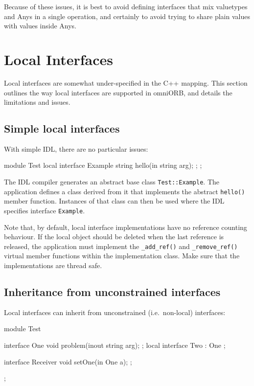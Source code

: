 \documentclass[11pt,twoside,a4paper]{book}
\newcommand{\type}[1]{\texttt{#1}}
\newcommand{\op}[1]{\texttt{#1()}}
\begin{document}
Because of these issues, it is best to avoid defining interfaces that
mix valuetypes and Anys in a single operation, and certainly to avoid
trying to share plain values with values inside Anys.


\section{Local Interfaces}
\label{sec:LocalInterfaces}

Local interfaces are somewhat under-specified in the C++ mapping. This
section outlines the way local interfaces are supported in omniORB,
and details the limitations and issues.

\subsection{Simple local interfaces}

With simple IDL, there are no particular issues:

\begin{idllisting}
module Test {
  local interface Example {
    string hello(in string arg);
  };
};
\end{idllisting}

The IDL compiler generates an abstract base class
\type{Test::Example}. The application defines a class derived from it
that implements the abstract \op{hello} member function. Instances of
that class can then be used where the IDL specifies interface
\type{Example}.

Note that, by default, local interface implementations have no
reference counting behaviour. If the local object should be deleted
when the last reference is released, the application must implement
the \op{\_add\_ref} and \op{\_remove\_ref} virtual member functions
within the implementation class. Make sure that the implementations
are thread safe.


\subsection{Inheritance from unconstrained interfaces}

Local interfaces can inherit from unconstrained (i.e.\ non-local)
interfaces:

\begin{idllisting}
module Test {
  interface One {
    void problem(inout string arg);
  };
  local interface Two : One {
  };

  interface Receiver {
    void setOne(in One a);
  };
};
\end{idllisting}
\end{document}
